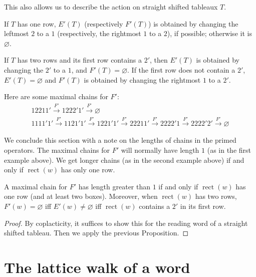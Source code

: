 \documentclass[ALCO,ThmDefs,Unicode,epreuves]{cedram}
\DeclareMathOperator{\rectify}{rect}
\begin{document}
This also allows us to describe the action on straight shifted tableaux $T$.

\begin{prop} \label{prop:rect-primed-action}
If $T$ has one row, $E'(T)$ \textup{(}respectively $F'(T)$\textup{)} is obtained by changing the leftmost $2$ to a $1$ \textup{(}respectively, the rightmost $1$ to a $2$\textup{)}, if possible; otherwise it is $\varnothing$.

If $T$ has two rows and its first row contains a $2'$, then $E'(T)$ is obtained by changing the $2'$ to a $1$, and $F'(T) = \varnothing$. If the first row does not contain a $2'$, $E'(T) = \varnothing$ and $F'(T)$ is obtained by changing the rightmost $1$ to a $2'$.
\end{prop}

\begin{exam} Here are some maximal chains for $F'$:
\begin{gather*}
12211' \xrightarrow{F'} 1222'1' \xrightarrow{F'} \varnothing
\\
1111'1' 
\xrightarrow{F'} 1121'1' 
\xrightarrow{F'} 1221'1' 
\xrightarrow{F'} 22211' 
\xrightarrow{F'} 2222'1
\xrightarrow{F'} 2222'2'
\xrightarrow{F'} \varnothing
\end{gather*}
\end{exam}


We conclude this section with a note on the lengths of chains in the primed operators. The maximal chains for $F'$ will normally have length $1$ (as in the first example above). We get longer chains (as in the second example above) if and only if $\rectify(w)$ has only one row. 

\begin{prop}\label{lem:maxchains}
A maximal chain for $F'$ has length greater than $1$ if and only if $\rectify(w)$ has one row \textup{(}and at least two boxes\textup{)}. Moreover, when $\rectify(w)$ has two rows, $F'(w) = \varnothing$ iff $E'(w) \neq \varnothing$ iff $\rectify(w)$ contains a $2'$ in its first row.
\end{prop}

\begin{proof}
By coplacticity, it suffices to show this for the reading word of a straight shifted tableau. Then we apply the previous Proposition. \end{proof}


\section{The lattice walk of a word}\label{sec:walks}
\end{document}
